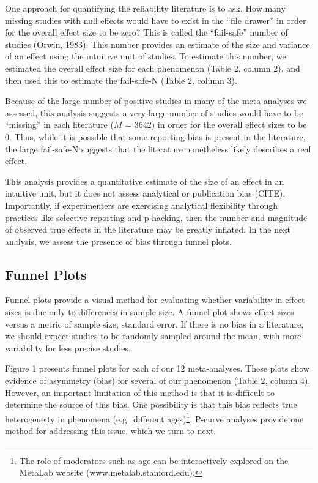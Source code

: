 \documentclass[english,floatsintext,man]{apa6}
\begin{document}
One approach for quantifying the reliability literature is to ask, How
many missing studies with null effects would have to exist in the
\enquote{file drawer} in order for the overall effect size to be zero?
This is called the \enquote{fail-safe} number of studies (Orwin, 1983).
This number provides an estimate of the size and variance of an effect
using the intuitive unit of studies. To estimate this number, we
estimated the overall effect size for each phenomenon (Table 2, column
2), and then used this to estimate the fail-safe-N (Table 2, column 3).

Because of the large number of positive studies in many of the
meta-analyses we assessed, this analysis suggests a very large number of
studies would have to be \enquote{missing} in each literature (\(M\) =
3642) in order for the overall effect sizes to be 0. Thus, while it is
possible that some reporting bias is present in the literature, the
large fail-safe-N suggests that the literature nonetheless likely
describes a real effect.

This analysis provides a quantitative estimate of the size of an effect
in an intuitive unit, but it does not assess analytical or publication
bias (CITE). Importantly, if experimenters are exercising analytical
flexibility through practices like selective reporting and p-hacking,
then the number and magnitude of observed true effects in the literature
may be greatly inflated. In the next analysis, we assess the presence of
bias through funnel plots.

\subsection{Funnel Plots}\label{funnel-plots}

Funnel plots provide a visual method for evaluating whether variability
in effect sizes is due only to differences in sample size. A funnel plot
shows effect sizes versus a metric of sample size, standard error. If
there is no bias in a literature, we should expect studies to be
randomly sampled around the mean, with more variability for less precise
studies.

Figure 1 presents funnel plots for each of our 12 meta-analyses. These
plots show evidence of asymmetry (bias) for several of our phenomenon
(Table 2, column 4). However, an important limitation of this method is
that it is difficult to determine the source of this bias. One
possibility is that this bias reflects true heterogeneity in phenomena
(e.g.~different
ages)\footnote{The role of moderators such as age can be interactively explored on the MetaLab website (www.metalab.stanford.edu).}.
P-curve analyses provide one method for addressing this issue, which we
turn to next.
\end{document}
